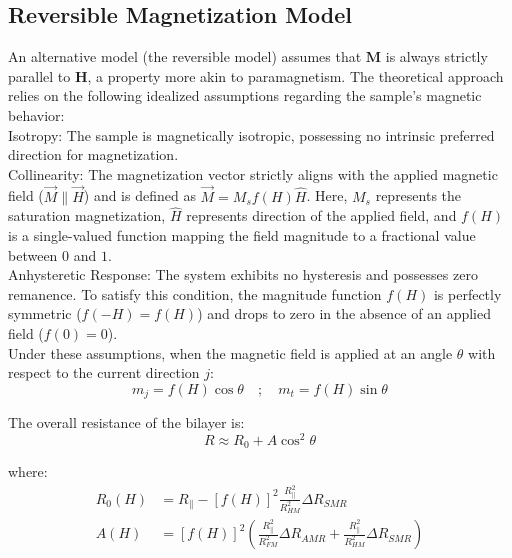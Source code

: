 \documentclass[11pt,a4paper]{article}
\begin{document}
\subsection{Reversible Magnetization Model}
An alternative model (the reversible model) assumes that $\mathbf{M}$ is always strictly parallel to $\mathbf{H}$, a property more akin to paramagnetism. The theoretical approach relies on the following idealized assumptions regarding the sample's magnetic behavior:\\
Isotropy: The sample is magnetically isotropic, possessing no intrinsic preferred direction for magnetization.\\ Collinearity: The magnetization vector strictly aligns with the applied magnetic field ($\vec{M} \parallel \vec{H}$) and is defined as $\vec{M} = M_s f(H) \hat{H}$. Here, $M_s$ represents the saturation magnetization, $\hat{H}$ represents direction of the applied field, and $f(H)$ is a single-valued function mapping the field magnitude to a fractional value between $0$ and $1$.\\ Anhysteretic Response: The system exhibits no hysteresis and possesses zero remanence. To satisfy this condition, the magnitude function $f(H)$ is perfectly symmetric ($f(-H) = f(H)$) and drops to zero in the absence of an applied field ($f(0) = 0$).\\
Under these assumptions, when the magnetic field is applied at an angle $\theta$ with respect to the current direction $j$:
\begin{equation}
    m_j = f(H)\cos\theta \quad ; \quad m_t = f(H)\sin\theta
\end{equation}

The overall resistance of the bilayer is:
\begin{equation}
    R \approx R_0 + A\cos^2 \theta
\end{equation}

where:
\begin{align}
    R_0(H) &=  R_{\parallel} - [f(H)]^2 \frac{R_{\parallel}^2}{R_{HM}^2}\Delta R_{SMR} \\
    A(H) &= [f(H)]^2 \left( \frac{R_{\parallel}^2}{R_{FM}^2}\Delta R_{AMR} + \frac{R_{\parallel}^2}{R_{HM}^2}\Delta R_{SMR} \right)
\end{align}
\end{document}
